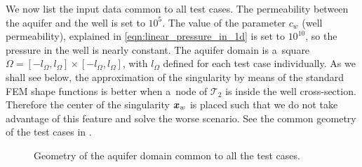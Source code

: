 We now list the input data common to all test cases.
The permeability between the aquifer and the well is set to $10^5$.
The value of the parameter $c_w$ (well permeability), explained in \eqref{eqn:linear_pressure_in_1d} is set to $10^{10}$,
so the pressure in the well is nearly constant.
The aquifer domain is a~square $\Omega=[-l_\Omega, l_\Omega]\times[-l_\Omega,l_\Omega]$, with $l_
\Omega$ defined for each test case individually.
As we shall see below, the approximation of the singularity by means of the standard FEM shape functions is better 
when a~node of $\mathcal{T}_{2}$ is inside the well cross-section. Therefore the center of the singularity $\mathbf{\boldsymbol{x}}_w$
is placed such that we do not take advantage of this feature and solve the worse scenario.
See the common geometry of the test cases in .

\begin{figure}[!htb]
    \centering    
    \def\svgwidth{0.35\textwidth}
        
  \caption[Geometry of the aquifer domain.]{Geometry of the aquifer domain common to all the test cases.}
  \label{fig:test_cases_geometry}
\end{figure}

